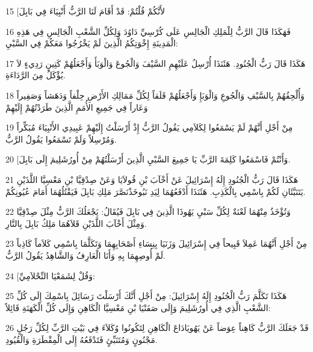 \par 15 [لأَنَّكُمْ قُلْتُمْ: قَدْ أَقَامَ لَنَا الرَّبُّ أَنْبِيَاءَ فِي بَابِلَ
\par 16 فَهَكَذَا قَالَ الرَّبُّ لِلْمَلِكِ الْجَالِسِ عَلَى كُرْسِيِّ دَاوُدَ وَلِكُلِّ الشَّعْبِ الْجَالِسِ فِي هَذِهِ الْمَدِينَةِ إِخْوَتِكُمُ الَّذِينَ لَمْ يَخْرُجُوا مَعَكُمْ فِي السَّبْيِ:
\par 17 هَكَذَا قَالَ رَبُّ الْجُنُودِ. هَئَنَذَا أُرْسِلُ عَلَيْهِمِ السَّيْفَ وَالْجُوعَ وَالْوَبَأَ وَأَجْعَلُهُمْ كَتِينٍ رَدِيءٍ لاَ يُؤْكَلُ مِنَ الرَّدَاءَةِ.
\par 18 وَأُلْحِقُهُمْ بِالسَّيْفِ وَالْجُوعِ وَالْوَبَإِ وَأَجْعَلُهُمْ قَلَقاً لِكُلِّ مَمَالِكِ الأَرْضِ حِلْفاً وَدَهَشاً وَصَفِيراً وَعَاراً فِي جَمِيعِ الأُمَمِ الَّذِينَ طَرَدْتُهُمْ إِلَيْهِمْ
\par 19 مِنْ أَجْلِ أَنَّهُمْ لَمْ يَسْمَعُوا لِكَلاَمِي يَقُولُ الرَّبُّ إِذْ أَرْسَلْتُ إِلَيْهِمْ عَبِيدِي الأَنْبِيَاءَ مُبَكِّراً وَمُرْسِلاً وَلَمْ تَسْمَعُوا يَقُولُ الرَّبُّ.
\par 20 [وَأَنْتُمْ فَاسْمَعُوا كَلِمَةَ الرَّبِّ يَا جَمِيعَ السَّبْيِ الَّذِينَ أَرْسَلْتُهُمْ مِنْ أُورُشَلِيمَ إِلَى بَابِلَ.
\par 21 هَكَذَا قَالَ رَبُّ الْجُنُودِ إِلَهُ إِسْرَائِيلَ عَنْ أَخْآبَ بْنِ قُولاَيَا وَعَنْ صِدْقِيَّا بْنِ مَعْسِيَّا اللَّذَيْنِ يَتَنَبَّئَانِ لَكُمْ بِاسْمِي بِالْكَذِبِ. هَئَنَذَا أَدْفَعُهُمَا لِيَدِ نَبُوخَذْنَصَّرَ مَلِكِ بَابِلَ فَيَقْتُلُهُمَا أَمَامَ عُيُونِكُمْ.
\par 22 وَتُؤْخَذُ مِنْهُمَا لَعْنَةٌ لِكُلِّ سَبْيِ يَهُوذَا الَّذِينَ فِي بَابِلَ فَيُقَالُ: يَجْعَلُكَ الرَّبُّ مِثْلَ صِدْقِيَّا وَمِثْلَ أَخْآبَ اللَّذَيْنِ قَلاَهُمَا مَلِكُ بَابِلَ بِالنَّارِ.
\par 23 مِنْ أَجْلِ أَنَّهُمَا عَمِلاَ قَبِيحاً فِي إِسْرَائِيلَ وَزَنَيَا بِنِسَاءِ أَصْحَابِهِمَا وَتَكَلَّمَا بِاسْمِي كَلاَماً كَاذِباً لَمْ أُوصِهِمَا بِهِ وَأَنَا الْعَارِفُ وَالشَّاهِدُ يَقُولُ الرَّبُّ.
\par 24 [وَقُلْ لِشَمَعْيَا النِّحْلاَمِيِّ:
\par 25 هَكَذَا تَكَلَّمَ رَبُّ الْجُنُودِ إِلَهُ إِسْرَائِيلَ: مِنْ أَجْلِ أَنَّكَ أَرْسَلْتَ رَسَائِلَ بِاسْمِكَ إِلَى كُلِّ الشَّعْبِ الَّذِي فِي أُورُشَلِيمَ وَإِلَى صَفَنْيَا بْنِ مَعْسِيَّا الْكَاهِنِ وَإِلَى كُلِّ الْكَهَنَةِ قَائِلاً:
\par 26 قَدْ جَعَلَكَ الرَّبُّ كَاهِناً عِوَضاً عَنْ يَهُويَادَاعَ الْكَاهِنِ لِتَكُونُوا وُكَلاَءَ فِي بَيْتِ الرَّبِّ لِكُلِّ رَجُلٍ مَجْنُونٍ وَمُتَنَبِّئٍ فَتَدْفَعُهُ إِلَى الْمِقْطَرَةِ وَالْقُيُودِ.
